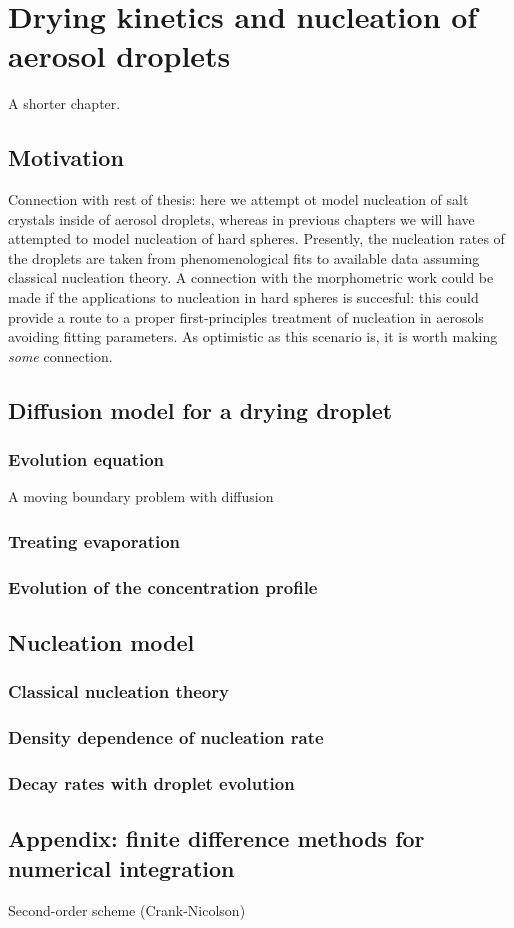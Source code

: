 \documentclass[12pt]{report}
\begin{document}
\chapter{Drying kinetics and nucleation of aerosol droplets}
A shorter chapter.

\section{Motivation}
Connection with rest of thesis: here we attempt ot model nucleation of salt crystals inside of aerosol droplets, whereas in previous chapters we will have attempted to model nucleation of hard spheres.
Presently, the nucleation rates of the droplets are taken from phenomenological fits to available data assuming classical nucleation theory.
A connection with the morphometric work could be made if the applications to nucleation in hard spheres is succesful: this could provide a route to a proper first-principles treatment of nucleation in aerosols avoiding fitting parameters.
As optimistic as this scenario is, it is worth making \emph{some} connection.

\section{Diffusion model for a drying droplet}
\subsection{Evolution equation}
A moving boundary problem with diffusion
\subsection{Treating evaporation}
\subsection{Evolution of the concentration profile}

\section{Nucleation model}
\subsection{Classical nucleation theory}
\subsection{Density dependence of nucleation rate}
\subsection{Decay rates with droplet evolution}

\section{Appendix: finite difference methods for numerical integration}
Second-order scheme (Crank-Nicolson)
\end{document}
